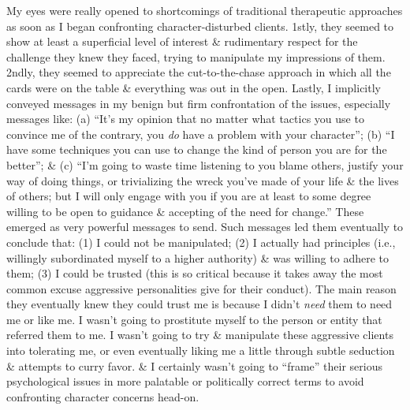 \documentclass{article}
\numberwithin{equation}{section}
\begin{document}
\begin{itemize}
    My eyes were really opened to shortcomings of traditional therapeutic approaches as soon as I began confronting character-disturbed clients. 1stly, they seemed to show at least a superficial level of interest \& rudimentary respect for the challenge they knew they faced, trying to manipulate my impressions of them. 2ndly, they seemed to appreciate the cut-to-the-chase approach in which all the cards were on the table \& everything was out in the open. Lastly, I implicitly conveyed messages in my benign but firm confrontation of the issues, especially messages like: (a) ``It's my opinion that no matter what tactics you use to convince me of the contrary, you \textit{do} have a problem with your character''; (b) ``I have some techniques you can use to change the kind of person you are for the better''; \& (c) ``I'm going to waste time listening to you blame others, justify your way of doing things, or trivializing the wreck you've made of your life \& the lives of others; but I will only engage with you if you are at least to some degree willing to be open to guidance \& accepting of the need for change.'' These emerged as very powerful messages to send. Such messages led them eventually to conclude that: (1) I could not be manipulated; (2) I actually had principles (i.e., willingly subordinated myself to a higher authority) \& was willing to adhere to them; (3) I could be trusted (this is so critical because it takes away the most common excuse aggressive personalities give for their conduct). The main reason they eventually knew they could trust me is because I didn't \textit{need} them to need me or like me. I wasn't going to prostitute myself to the person or entity that referred them to me. I wasn't going to try \& manipulate these aggressive clients into tolerating me, or even eventually liking me a little through subtle seduction \& attempts to curry favor. \& I certainly wasn't going to ``frame'' their serious psychological issues in more palatable or politically correct terms to avoid confronting character concerns head-on.
    

\end{itemize}
\end{document}
